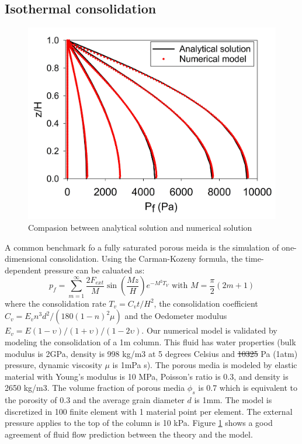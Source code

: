 \documentclass[preprint,12pt]{elsarticle}
\providecommand{\DIFadd}[1]{{\protect\color{blue}\uwave{#1}}} %
\providecommand{\DIFdel}[1]{{\protect\color{red}\sout{#1}}}                      %
\providecommand{\DIFaddbegin}{} %
\providecommand{\DIFaddend}{} %
\providecommand{\DIFdelbegin}{} %
\providecommand{\DIFdelend}{} %
\newcommand{\DIFscaledelfig}{0.5}
\newlength{\DIFdelgraphicswidth} %
\newlength{\DIFdelgraphicsheight} %
\newcommand{\DIFaddincludegraphics}[2][]{{\color{blue}\fbox{\DIFOincludegraphics[#1]{#2}}}} %
\newcommand{\DIFdelincludegraphics}[2][]{%
\sbox{\DIFdelgraphicsbox}{\DIFOincludegraphics[#1]{#2}}%
\settoboxwidth{\DIFdelgraphicswidth}{\DIFdelgraphicsbox} %
\settoboxtotalheight{\DIFdelgraphicsheight}{\DIFdelgraphicsbox} %
\scalebox{\DIFscaledelfig}{%
\parbox[b]{\DIFdelgraphicswidth}{\usebox{\DIFdelgraphicsbox}\\[-\baselineskip] \rule{\DIFdelgraphicswidth}{0em}}\llap{\resizebox{\DIFdelgraphicswidth}{\DIFdelgraphicsheight}{%
\setlength{\unitlength}{\DIFdelgraphicswidth}%
\begin{picture}(1,1)%
\thicklines\linethickness{2pt} %
{\color[rgb]{1,0,0}\put(0,0){\framebox(1,1){}}}%
{\color[rgb]{1,0,0}\put(0,0){\line( 1,1){1}}}%
{\color[rgb]{1,0,0}\put(0,1){\line(1,-1){1}}}%
\end{picture}%
}\hspace*{3pt}}} %
} %
\DeclareRobustCommand{\DIFaddbegin}{\DIFOaddbegin \let\includegraphics\DIFaddincludegraphics} %
\DeclareRobustCommand{\DIFaddend}{\DIFOaddend \let\includegraphics\DIFOincludegraphics} %
\DeclareRobustCommand{\DIFdelbegin}{\DIFOdelbegin \let\includegraphics\DIFdelincludegraphics} %
\DeclareRobustCommand{\DIFdelend}{\DIFOaddend \let\includegraphics\DIFOincludegraphics} %
\begin{document}
\subsection{\textsf{Isothermal consolidation}}
%
%
\begin{figure}[h]
\center
\includegraphics[scale=.3]{consolidation.jpg}
\caption{Compasion between analytical solution and numerical solution}
\label{fig:consolidation}
\end{figure}
%
%
A common benchmark fo a fully saturated porous meida is the simulation of one-dimensional consolidation. Using the Carman-Kozeny formula, the time-dependent pressure can be caluated as:
%
%
\begin{equation}
  p_f  = \sum_{m=1}^{\infty} \frac{2F_{ext}}{M} \sin (\frac{Mz}{H}) e^{-M^2T_V} \textrm{    with    }   M = \frac{\pi}{2} (2m+1)
\end{equation}
%
%
where the consolidation rate $T_v =C_vt/H^2$, the consolidation coefficient $C_v = E_v n^3 d^2/(180(1-n)^2\mu) $ and the Oedometer modulus $E_v = E(1-\upsilon)/(1+\upsilon)/(1-2\upsilon)$.
Our numerical model is validated by modeling the consolidation of a 1m column. This fluid has water properties (bulk modulus is 2GPa, density is 998 kg/m3 at 5 degrees Celsius and \DIFdelbegin \DIFdel{10325 }\DIFdelend \DIFaddbegin \DIFadd{101325 }\DIFaddend Pa (1atm) pressure, dynamic viscosity $\mu$ is 1mPa s). The porous media is modeled by elastic material with Young's modulus is 10 MPa, Poisson's ratio is 0.3, and density is 2650 kg/m3. The volume fraction of porous media $\phi_s$ is 0.7 which is equivalent to the porosity of 0.3 and the average grain diameter $d$ is 1mm. The model is discretized in 100 finite element with 1 material point per element. The external pressure applies to the top of the column is 10 kPa. Figure \ref{fig:consolidation} shows a good agreement of fluid flow prediction between the theory and the model. \\
\end{document}
